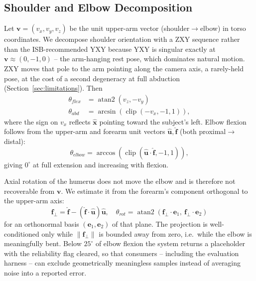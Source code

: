 \documentclass[conference]{IEEEtran}
\begin{document}
\subsection{Shoulder and Elbow Decomposition}
\label{sec:angles}
Let $\mathbf{v} = (v_x, v_y, v_z)$ be the unit upper-arm vector
(shoulder$\to$elbow) in torso coordinates. We decompose shoulder
orientation with a ZXY sequence rather than the ISB-recommended YXY
because YXY is singular exactly at $\mathbf{v}\approx(0,-1,0)$ -- the
arm-hanging rest pose, which dominates natural motion. ZXY moves that
pole to the arm pointing along the camera axis, a rarely-held pose, at
the cost of a second degeneracy at full abduction
(Section~\ref{sec:limitations}). Then
\begin{align}
\theta_{flex} &= \operatorname{atan2}(v_z, -v_y) \\
\theta_{abd} &= \arcsin(\operatorname{clip}(-v_x, -1, 1)),
\end{align}
where the sign on $v_x$ reflects $\hat{\mathbf{x}}$ pointing toward the
subject's left. Elbow flexion follows from the upper-arm and forearm unit
vectors $\hat{\mathbf{u}}, \hat{\mathbf{f}}$ (both proximal$\to$distal):
\begin{equation}
\theta_{elbow} = \arccos(\operatorname{clip}(\hat{\mathbf{u}}\cdot\hat{\mathbf{f}}, -1, 1)),
\end{equation}
giving $0^\circ$ at full extension and increasing with flexion.

Axial rotation of the humerus does not move the elbow and is therefore
not recoverable from $\mathbf{v}$. We estimate it from the forearm's
component orthogonal to the upper-arm axis:
\begin{equation}
\mathbf{f}_\perp = \hat{\mathbf{f}} - (\hat{\mathbf{f}}\cdot\hat{\mathbf{u}})\hat{\mathbf{u}}, \quad
\theta_{rot} = \operatorname{atan2}(\mathbf{f}_\perp\!\cdot\!\mathbf{e}_1,\ \mathbf{f}_\perp\!\cdot\!\mathbf{e}_2)
\end{equation}
for an orthonormal basis $(\mathbf{e}_1, \mathbf{e}_2)$ of that plane.
The projection is well-conditioned only while $\|\mathbf{f}_\perp\|$ is
bounded away from zero, i.e.\ while the elbow is meaningfully bent. Below
$25^\circ$ of elbow flexion the system returns a placeholder with the
reliability flag cleared, so that consumers -- including the evaluation
harness -- can exclude geometrically meaningless samples instead of
averaging noise into a reported error.
\end{document}
